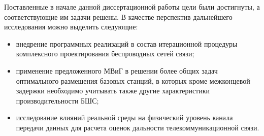     


Поставленные в начале данной диссертационной работы цели были достигнуты, а соответствующие им задачи решены. В качестве перспектив дальнейшего исследования можно выделить следующие:
\begin{itemize}
    \item внедрение программных реализаций в состав итерационной процедуры комплексного проектирования беспроводных сетей связи;
    \item  применение предложенного МВиГ в решении более общих   задач оптимального размещения базовых станций, в которых кроме межконцевой задержки необходимо учитывать также  другие характеристики производительности БШС;
    \item исследование влияний реальной среды на физический уровень канала передачи данных для расчета оценок дальности телекоммуникационной связи.
    
\end{itemize}



